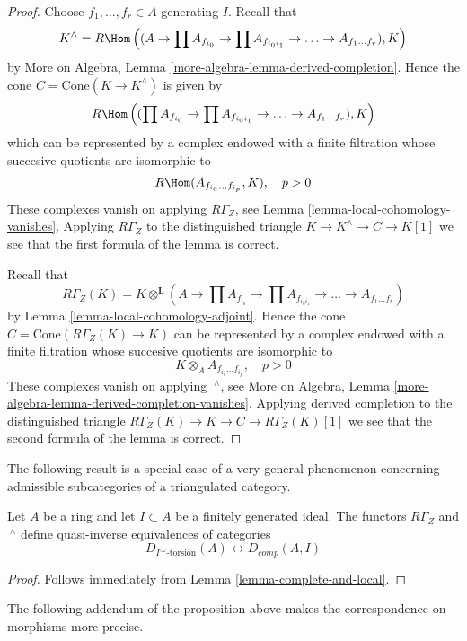 \begin{proof}
Choose $f_1, \ldots, f_r \in A$ generating $I$. Recall that
$$
K^\wedge = R\Hom\left((A \to \prod A_{f_{i_0}}
\to \prod A_{f_{i_0i_1}} \to \ldots \to A_{f_1 \ldots f_r}), K\right)
$$
by More on Algebra, Lemma \ref{more-algebra-lemma-derived-completion}.
Hence the cone $C = \text{Cone}(K \to K^\wedge)$
is given by
$$
R\Hom\left((\prod A_{f_{i_0}}
\to \prod A_{f_{i_0i_1}} \to \ldots \to A_{f_1 \ldots f_r}), K\right)
$$
which can be represented by a complex endowed with a finite filtration
whose succesive quotients are isomorphic to
$$
R\Hom(A_{f_{i_0} \ldots f_{i_p}}, K), \quad p > 0
$$
These complexes vanish on applying $R\Gamma_Z$, see
Lemma \ref{lemma-local-cohomology-vanishes}. Applying $R\Gamma_Z$
to the distinguished triangle $K \to K^\wedge \to C \to K[1]$
we see that the first formula of the lemma is correct.

\medskip\noindent
Recall that
$$
R\Gamma_Z(K) =
K \otimes^\mathbf{L} (A \to \prod A_{f_{i_0}}
\to \prod A_{f_{i_0i_1}} \to \ldots \to A_{f_1 \ldots f_r})
$$
by Lemma \ref{lemma-local-cohomology-adjoint}.
Hence the cone $C = \text{Cone}(R\Gamma_Z(K) \to K)$
can be represented by a complex endowed with a finite filtration
whose succesive quotients are isomorphic to
$$
K \otimes_A A_{f_{i_0} \ldots f_{i_p}}, \quad p > 0
$$
These complexes vanish on applying ${\ }^\wedge$, see
More on Algebra, Lemma \ref{more-algebra-lemma-derived-completion-vanishes}.
Applying derived completion to the distinguished triangle
$R\Gamma_Z(K) \to K \to C \to R\Gamma_Z(K)[1]$
we see that the second formula of the lemma is correct.
\end{proof}

\noindent
The following result is a special case of a very general phenomenon
concerning admissible subcategories of a triangulated category.

\begin{proposition}
\label{proposition-torsion-complete}
Let $A$ be a ring and let $I \subset A$ be a finitely generated ideal.
The functors $R\Gamma_Z$ and ${\ }^\wedge$
define quasi-inverse equivalences of categories
$$
D_{I^\infty\text{-torsion}}(A) \leftrightarrow D_{comp}(A, I)
$$
\end{proposition}

\begin{proof}
Follows immediately from Lemma \ref{lemma-complete-and-local}.
\end{proof}

\noindent
The following addendum of the proposition above makes the
correspondence on morphisms more precise.

